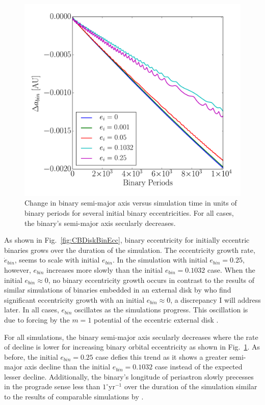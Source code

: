 \begin{figure}
	\includegraphics[width=\columnwidth]{f7}
    \caption{Change in binary semi-major axis versus simulation time in units of binary periods for several initial binary eccentricities. For all cases, the binary's semi-major axis secularly decreases.}
    \label{fig:CBDiskBinSemi}
\end{figure}

As shown in Fig.~\ref{fig:CBDiskBinEcc}, binary eccentricity for
initially eccentric binaries grows over the duration
of the simulation.  The eccentricity growth rate, $\dot{e}_{bin}$,
seems to scale with initial $e_{bin}$.  In the simulation with initial
$e_{bin} = 0.25$, however, $e_{bin}$ increases more slowly than the
initial $e_{bin} = 0.1032$ case.  When the initial $e_{bin} \approx
0$, no binary eccentricity growth occurs in contrast to the results of
similar simulations of binaries embedded in an external disk by
\citet{Papaloizou2001,Pierens2007,Cuadra2009} who find significant
eccentricity growth with an initial $e_{bin} \approx 0$, a discrepancy
I will address later.  In all cases, $e_{bin}$ oscillates as the simulations progress.  This oscillation is due to forcing by the $m = 1$ potential of the eccentric 
external disk \citep{Artymowicz2000}.

For all simulations, the binary semi-major axis secularly decreases where the rate of decline is lower for increasing binary orbital eccentricity as shown in Fig.~\ref{fig:CBDiskBinSemi}.  As before, the initial $e_{bin} = 0.25$ case defies this trend as it shows a greater semi-major axis decline than the initial $e_{bin} = 0.1032$ case instead of the expected lesser decline.  Additionally, the binary's longitude of periastron slowly precesses in the prograde sense less than $1^{\circ}$yr$^{-1}$ over the duration of the simulation similar to the results of comparable simulations by \citet{Kley2015}.

